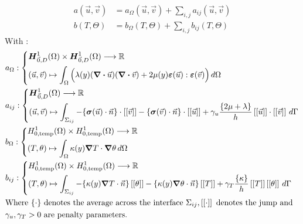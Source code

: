 \documentclass[a4paper,12pt,twoside]{report}
\newcommand{\mtr}{\mathbb{R}}
\begin{document}
\begin{align*}
a(\vec u,\vec v) &= a_\Omega(\vec u,\vec v) + \sum_{i,j} a_{ij}(\vec u,\vec v) \\
b(T,\Theta) &= b_\Omega(T,\Theta) + \sum_{i,j} b_{ij}(T,\Theta)
\end{align*}
With : 
\begin{equation*}
	\begin{aligned}
	& a_\Omega : \left\{
		\begin{aligned}
			& \boldsymbol{H}^1_{\vec 0,D}(\Omega) \times \boldsymbol{H}^1_{\vec 0,D}(\Omega) \longrightarrow \mtr \\
			& (\vec u, \vec v) \mapsto \int_{\Omega} \Big( \lambda(y) (\div \vec u) (\div \vec v) + 2\mu(y) \boldsymbol{\varepsilon}(\vec u) : \boldsymbol{\varepsilon}(\vec v) \Big) \, d\Omega 
		\end{aligned}
	\right. \\
	& a_{ij} : \left\{
		\begin{aligned}
			& \boldsymbol{H}^1_{\vec 0,D}(\Omega) \longrightarrow \mtr \\ 
			& (\vec u, \vec v) \mapsto \int_{\Sigma_{ij}} - \{\boldsymbol{\sigma}(\vec u) \cdot \vec n\} \cdot \left[\left[ \vec v \right]\right] - \{\boldsymbol{\sigma}(\vec v) \cdot \vec n\} \cdot \left[\left[ \vec u \right]\right] + \gamma_u \frac{\{2 \mu + \lambda\}}{h} \left[\left[ \vec u \right]\right] \cdot \left[\left[ \vec v \right]\right] \, d\Gamma
		\end{aligned}
	\right.\\
	& b_\Omega : \left\{
		\begin{aligned}
			& H^1_{0,\text{temp}}(\Omega) \times H^1_{0,\text{temp}}(\Omega) \longrightarrow \mtr \\
			& (T, \theta) \mapsto \int_{\Omega} \kappa(y) \grad T \cdot \grad \theta \, d\Omega 
		\end{aligned}
	\right. \\
	& b_{ij} : \left\{
		\begin{aligned}
			& H^1_{0,\text{temp}}(\Omega) \times H^1_{0,\text{temp}}(\Omega) \longrightarrow \mtr \\
			& (T, \theta) \mapsto \int_{\Sigma_{ij}} - \{ \kappa(y) \grad T \cdot \vec n \} \left[\left[ \theta \right]\right] - \{ \kappa(y) \grad \theta \cdot \vec n \}  \left[\left[ T \right]\right] + \gamma_T \frac{\{ \kappa \}}{h} \left[\left[ T \right]\right]\left[\left[ \theta \right]\right] \, d\Gamma
		\end{aligned}
	\right. \\
	& \text{Where } \{ \cdot \} \text{ denotes the average across the interface } \Sigma_{ij}, \left[\left[\cdot\right]\right] \text{ denotes the jump and } \\
	& \gamma_u, \gamma_T > 0 \text{ are penalty parameters.} 
	\end{aligned}
\end{equation*}
\end{document}
